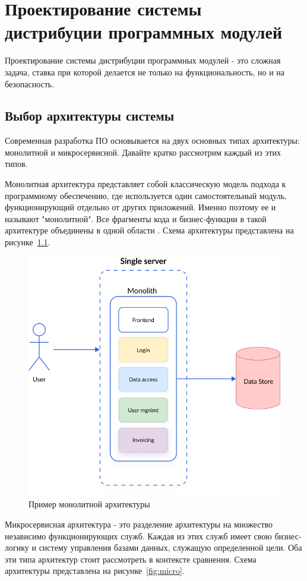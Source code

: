 \chapter{  Проектирование системы дистрибуции программных модулей}
\label{cha:design}

Проектирование системы дистрибуции программных модулей - это сложная задача, ставка при которой делается не только на функциональность, но и на безопасность. 

\section{Выбор архитектуры системы}

Современная разработка ПО основывается на двух основных типах архитектуры: монолитной и микросервисной. Давайте кратко рассмотрим каждый из этих типов. 

Монолитная архитектура представляет собой классическую модель подхода к программному обеспечению, где используется один самостоятельный модуль, функционирующий отдельно от других приложений. Именно поэтому ее и называют "монолитной". Все фрагменты кода и бизнес-функции в такой архитектуре объединены в одной области \cite{arch:monovsmicro}. Схема архитектуры представлена на рисунке~\ref{fig:mono}.

\begin{figure}
  \centering
  \includegraphics[width=.7\textwidth]{graphics/img/mono.png}
  \caption{Пример монолитной архитектуры}
  \label{fig:mono}
\end{figure}

\newpage

Микросервисная архитектура - это разделение архитектуры на множество независимо функционирующих служб. Каждая из этих служб имеет свою бизнес-логику и систему управления базами данных, служащую определенной цели. Оба эти типа архитектур стоит рассмотреть в контексте сравнения. Схема архитектуры представлена на рисунке~\ref{fig:micro}.

